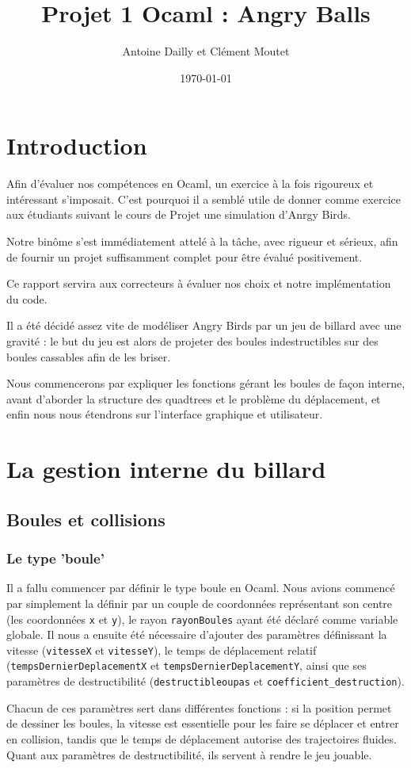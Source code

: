 \documentclass[10pt]{article}
\title{Projet 1 Ocaml : Angry Balls}
\date{\today}
\author{Antoine Dailly et Clément Moutet}
\begin{document}
\maketitle

\tableofcontents

\section*{Introduction}


Afin d'évaluer nos compétences en Ocaml, un exercice à la fois rigoureux et intéressant s'imposait. C'est pourquoi il a semblé utile de donner comme exercice aux étudiants suivant le cours de Projet une simulation d'Anrgy Birds.
\par Notre binôme s'est immédiatement attelé à la tâche, avec rigueur et sérieux, afin de fournir un projet suffisamment complet pour être évalué positivement.
\par Ce rapport servira aux correcteurs à évaluer nos choix et notre implémentation du code.
\par Il a été décidé assez vite de modéliser Angry Birds par un jeu de billard avec une gravité : le but du jeu est alors de projeter des boules indestructibles sur des boules cassables afin de les briser.
\par Nous commencerons par expliquer les fonctions gérant les boules de façon interne, avant d'aborder la structure des quadtrees et le problème du déplacement, et enfin nous nous étendrons sur l'interface graphique et utilisateur.


\section{La gestion interne du billard}


\subsection{Boules et collisions}
\subsubsection{Le type 'boule'}
Il a fallu commencer par définir le type boule en Ocaml. Nous avions commencé par simplement la définir par un couple de coordonnées 
représentant son centre (les coordonnées \texttt{x} et \texttt{y}), le rayon \texttt{rayonBoules} ayant été déclaré comme variable globale. Il nous a ensuite été nécessaire d'ajouter des paramètres 
définissant la vitesse (\texttt{vitesseX} et \texttt{vitesseY}), le temps de déplacement relatif (\texttt{tempsDernierDeplacementX} 
et \texttt{tempsDernierDeplacementY}, ainsi que ses paramètres de destructibilité (\texttt{destructibleoupas} et 
\texttt{coefficient\_destruction}).
\par Chacun de ces paramètres sert dans différentes fonctions : si la position permet de dessiner les boules, la vitesse est 
essentielle pour les faire se déplacer et entrer en collision, tandis que le temps de déplacement autorise des trajectoires fluides.
Quant aux paramètres de destructibilité, ils servent à rendre le jeu jouable.
\end{document}

